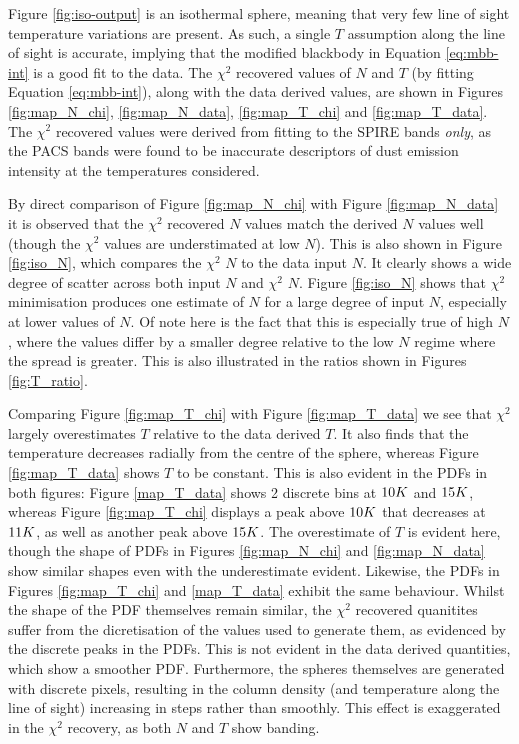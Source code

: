 \documentclass{report}
\begin{document}
Figure \ref{fig:iso-output} is an isothermal sphere, meaning that very few line of sight temperature variations are present. As such, a single $T$ assumption along the line of sight is accurate, implying that the modified blackbody in Equation \ref{eq:mbb-int} is a good fit to the data. The $\chi^{2}$ recovered values of $N$ and $T$ (by fitting Equation \ref{eq:mbb-int}), along with the data derived values, are shown in Figures \ref{fig:map_N_chi}, \ref{fig:map_N_data},
\ref{fig:map_T_chi} and \ref{fig:map_T_data}. The $\chi^{2}$ recovered values were derived from fitting to the SPIRE bands \textit{only}, as the PACS bands were found to be inaccurate descriptors of dust emission intensity at the temperatures considered.

By direct comparison of Figure \ref{fig:map_N_chi} with Figure \ref{fig:map_N_data} it is observed that the $\chi^{2}$ recovered $N$ values match the derived $N$ values well (though the $\chi^{2}$ values are understimated at low $N$). This is also shown in Figure \ref{fig:iso_N}, which compares the $\chi^{2}$ $N$ to the data input $N$. It clearly shows a wide degree of scatter across both input
$N$ and $\chi^{2}$ $N$. Figure \ref{fig:iso_N} shows that $\chi^{2}$ minimisation produces one estimate of $N$ for a large degree of input $N$, especially at lower values of $N$. Of note here is the fact that this is especially true of high $N$, where the values differ by a smaller degree relative to the low $N$ regime where the spread is greater. This is also illustrated in the ratios shown in Figures \ref{fig:T_ratio}.

Comparing Figure \ref{fig:map_T_chi} with Figure \ref{fig:map_T_data} we see that $\chi^{2}$ largely overestimates $T$ relative to the data derived $T$. It also finds that the temperature decreases radially from the centre of the sphere, whereas Figure \ref{fig:map_T_data} shows $T$ to be constant. This is also evident in the PDFs in both figures: Figure \ref{map_T_data} shows 2 discrete bins at $10\/K$ and
$15\/K$, whereas Figure \ref{fig:map_T_chi} displays a peak above $10\/K$ that decreases at $11\/K$, as well as another peak above $15\/K$. The overestimate of $T$ is evident here, though the shape of PDFs in Figures \ref{fig:map_N_chi} and \ref{fig:map_N_data} show similar shapes even with the underestimate evident. Likewise, the PDFs in Figures
\ref{fig:map_T_chi} and \ref{map_T_data} exhibit the same behaviour. Whilst the shape of the PDF themselves remain similar, the $\chi^{2}$ recovered quanitites suffer from the dicretisation of the values used to generate them, as evidenced by the discrete peaks in the PDFs. This is not evident in the data derived quantities, which show a smoother PDF. Furthermore, the spheres themselves are generated with discrete pixels, resulting in the column density (and temperature along the line of sight) increasing in steps rather than smoothly. This effect is exaggerated in the $\chi^{2}$ recovery, as both $N$ and $T$ show banding.
\end{document}
